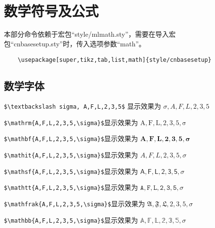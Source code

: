 \chapter{数学符号及公式}\label{cha:matheq}
本部分命令依赖于宏包“style/mlmath.sty”，需要在导入宏包“cnbasesetup.sty”时，传入选项参数“math”。
\begin{verbatim}
    \usepackage[super,tikz,tab,list,math]{style/cnbasesetup}
\end{verbatim}

\section{数学字体}

\begin{example}[数学文本测试]
    \verb|$\textbackslash sigma, A,F,L,2,3,5$| 显示效果为 $\sigma, A,F,L,2,3,5$
\end{example}
\begin{example}[mathrm测试]
    \texttt{\$\textbackslash mathrm\{A,F,L,2,3,5,\textbackslash sigma\}\$}显示效果为 $\mathrm{A,F,L,2,3,5,\sigma}$
\end{example}
\begin{example}[mathbf测试]
    \texttt{\$\textbackslash mathbf\{A,F,L,2,3,5,\textbackslash sigma\}\$}显示效果为 $\mathbf{A,F,L,2,3,5,\sigma}$
\end{example}
\begin{example}[mathit测试]
    \texttt{\$\textbackslash mathit\{A,F,L,2,3,5,\textbackslash sigma\}\$}显示效果为 $\mathit{A,F,L,2,3,5,\sigma}$
\end{example}
\begin{example}[mathsf测试]
    \texttt{\$\textbackslash mathsf\{A,F,L,2,3,5,\textbackslash sigma\}\$}显示效果为 $\mathsf{A,F,L,2,3,5,\sigma}$
\end{example}
\begin{example}[mathtt测试]
    \texttt{\$\textbackslash mathtt\{A,F,L,2,3,5,\textbackslash sigma\}\$}显示效果为 $\mathtt{A,F,L,2,3,5,\sigma}$
\end{example}
\begin{example}[mathfrak测试]
    \texttt{\$\textbackslash mathfrak\{A,F,L,2,3,5,\textbackslash sigma\}\$}显示效果为 $\mathfrak{A,F,L,2,3,5,\sigma}$
\end{example}
\begin{example}[mathbb测试]
    \texttt{\$\textbackslash mathbb\{A,F,L,2,3,5,\textbackslash sigma\}\$}显示效果为 $\mathbb{A,F,L,2,3,5,\sigma}$
\end{example}

